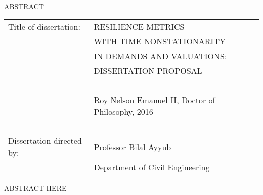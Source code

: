 
\hbox{\ }

\renewcommand{\baselinestretch}{1}
\small \normalsize

\begin{center}
\large{{ABSTRACT}} 

\vspace{3em} 

\end{center}
\hspace{-.15in}
\begin{tabular}{ll}

Title of dissertation:    & {\large  RESILIENCE METRICS }\\ 

&                                {\large WITH TIME NONSTATIONARITY }\\

&                                {\large  IN DEMANDS AND VALUATIONS:}\\

&                                {\large DISSERTATION PROPOSAL }\\
\ \\

&                          {\large  Roy Nelson Emanuel II, Doctor of Philosophy, 2016} \\

\ \\
Dissertation directed by: & {\large  Professor Bilal Ayyub} \\
&  				{\large	 Department of Civil Engineering } \\
\end{tabular}

\vspace{3em}

\renewcommand{\baselinestretch}{2}
\large \normalsize

ABSTRACT HERE


